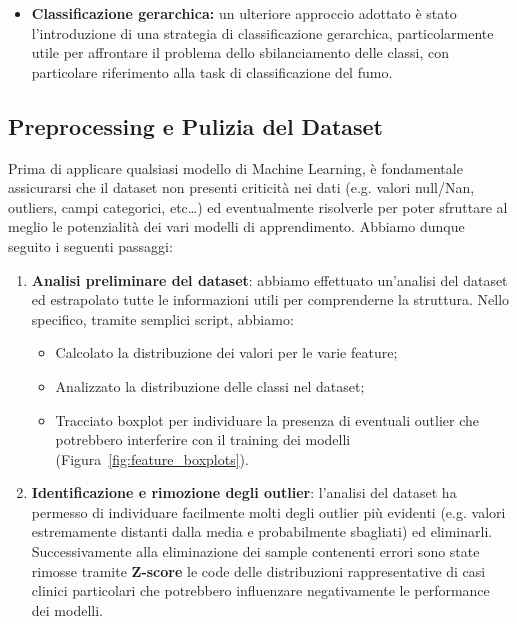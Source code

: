 \documentclass{article}
\begin{document}
\begin{multicols}{2}
\begin{itemize}[leftmargin=*]
    \item \textbf{Classificazione gerarchica:} 
    un ulteriore approccio adottato è stato l'introduzione di una strategia di classificazione gerarchica, particolarmente utile per affrontare il problema dello sbilanciamento delle classi, con particolare riferimento alla task di classificazione del fumo.
    
\end{itemize}


\subsection{Preprocessing e Pulizia del Dataset}

Prima di applicare qualsiasi modello di Machine Learning, è fondamentale assicurarsi che il dataset non presenti criticit\`a nei dati (e.g. valori null/Nan, outliers, campi categorici, etc\dots) ed eventualmente risolverle per poter sfruttare al meglio le potenzialità dei vari modelli di apprendimento.
Abbiamo dunque seguito i seguenti passaggi:

\begin{enumerate}[leftmargin=*]
    \item \textbf{Analisi preliminare del dataset}:
    abbiamo effettuato un'analisi del dataset ed estrapolato tutte le informazioni utili per comprenderne la struttura.
    Nello specifico, tramite semplici script, abbiamo:
    \begin{itemize}[leftmargin=*]
        \item Calcolato la distribuzione dei valori per le varie feature;
        \item Analizzato la distribuzione delle classi nel dataset;
        \item Tracciato boxplot per individuare la presenza di eventuali outlier che potrebbero interferire con il training dei modelli (Figura~\ref{fig:feature_boxplots}).
    \end{itemize}
    
    \item \textbf{Identificazione e rimozione degli outlier}:
    l'analisi del dataset ha permesso di individuare facilmente molti degli outlier più evidenti (e.g. valori estremamente distanti dalla media e probabilmente sbagliati) ed eliminarli.
    Successivamente alla eliminazione dei sample contenenti errori sono state rimosse tramite \textbf{Z-score} le code delle distribuzioni rappresentative di casi clinici particolari che potrebbero influenzare negativamente le performance dei modelli.~\cite{zscore}
    

\end{enumerate}
\end{multicols}
\end{document}

